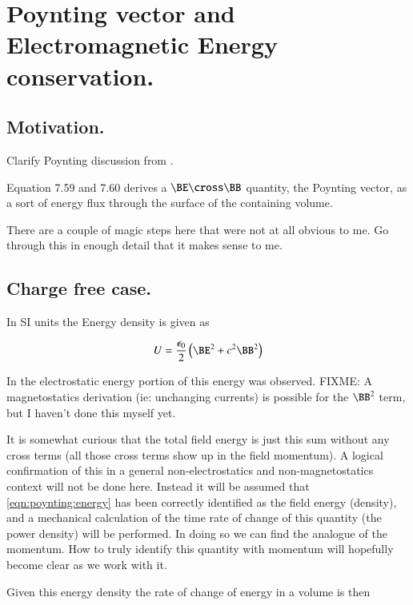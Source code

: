 \chapter{Poynting vector and Electromagnetic Energy conservation.}\label{chap:PJpoynting}
\date{ Dec 29, 2008.  $RCSfile: poynting.tex,v $ Last $Revision: 1.11 $ $Date: 2009/10/22 02:07:20 $ }

\section{Motivation. }

Clarify Poynting discussion from \cite{doran2003gap}.

Equation 7.59 and 7.60 derives a $\BE \cross \BB$ quantity, the Poynting vector, as a sort of energy flux through the surface of the containing volume.

There are a couple of magic steps here that were not at all obvious to me.  Go through this in enough detail that it makes sense to me.

\section{Charge free case. }

In SI units the Energy density is given as

\begin{align}\label{eqn:poynting:energy}
U = \frac{\epsilon_0}{2}\left( \BE^2 + c^2 \BB^2 \right)
\end{align}

In  the electrostatic energy portion of this
energy was observed.
FIXME: A magnetostatics derivation (ie: unchanging currents)
is possible for the $\BB^2$ term, but I haven't done this myself yet.

It is somewhat curious that the total field energy is just this 
sum without any cross terms (all those cross terms show up in the
field momentum).  A logical confirmation of this in a general
non-electrostatics and non-magnetostatics context will not be done here.
Instead it will be assumed that \ref{eqn:poynting:energy} has been correctly identified
as the field energy (density), and a mechanical calculation of the time 
rate of change of this
quantity (the power density) will be performed.  In doing so we can find the
analogue of the momentum.  How to truly identify this quantity with momentum
will hopefully become clear as we work with it.

Given this energy density the rate of change of energy in a volume is then

